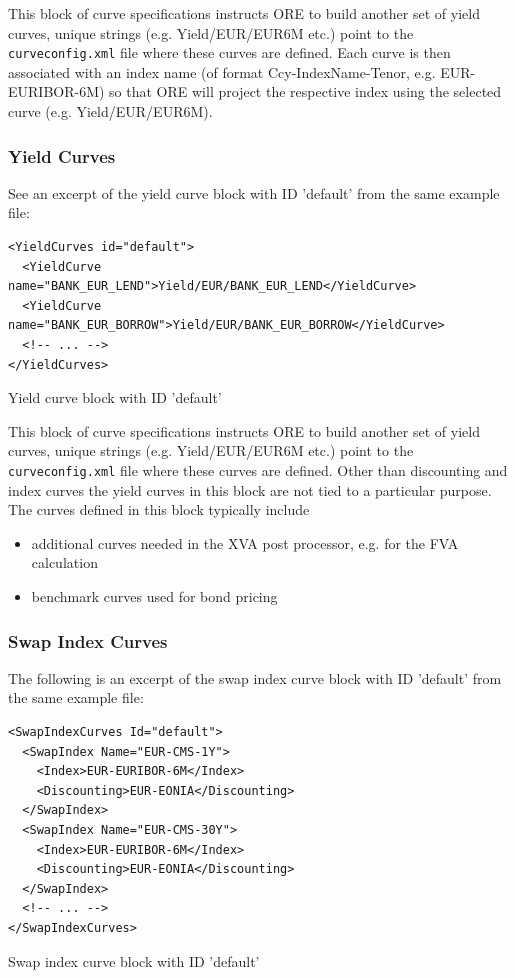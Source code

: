 \documentclass[12pt, a4paper]{article}
\begin{document}
{This block of curve specifications instructs ORE to build another set of yield curves, unique strings
(e.g. Yield/EUR/EUR6M etc.) point to the {\tt curveconfig.xml} file where these curves are defined. Each curve is then
associated with an index name (of format Ccy-IndexName-Tenor, e.g. EUR-EURIBOR-6M) so that ORE will project the
respective index using the selected curve (e.g. Yield/EUR/EUR6M).

\subsubsection{Yield Curves}

See an excerpt of the yield curve block with ID 'default' from the same example file:

\begin{listing}[H]
\begin{verbatim}
<YieldCurves id="default">
  <YieldCurve name="BANK_EUR_LEND">Yield/EUR/BANK_EUR_LEND</YieldCurve>
  <YieldCurve name="BANK_EUR_BORROW">Yield/EUR/BANK_EUR_BORROW</YieldCurve>
  <!-- ... -->
</YieldCurves>
\end{verbatim}
\caption{Yield curve block with ID 'default'}
\label{lst:yieldcurve_spec}
\end{listing}

This block of curve specifications instructs ORE to build another set of yield curves, unique strings
(e.g. Yield/EUR/EUR6M etc.) point to the {\tt curveconfig.xml} file where these curves are defined. Other than
discounting and index curves the yield curves in this block are not tied to a particular purpose. The curves defined in
this block typically include

\begin{itemize}
\item additional curves needed in the XVA post processor, e.g. for the FVA calculation
\item benchmark curves used for bond pricing
\end{itemize}

\subsubsection{Swap Index Curves}

The following is an excerpt of the swap index curve block with ID 'default' from the same example file:

\begin{listing}[H]
\begin{verbatim}
<SwapIndexCurves Id="default">
  <SwapIndex Name="EUR-CMS-1Y">
    <Index>EUR-EURIBOR-6M</Index>
    <Discounting>EUR-EONIA</Discounting>
  </SwapIndex>
  <SwapIndex Name="EUR-CMS-30Y">
    <Index>EUR-EURIBOR-6M</Index>
    <Discounting>EUR-EONIA</Discounting>
  </SwapIndex>
  <!-- ... -->
</SwapIndexCurves>
\end{verbatim}
\caption{Swap index curve block with ID 'default'}
\label{lst:swapindexcurve_spec}
\end{listing}

}
\end{document}
